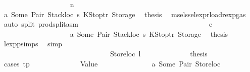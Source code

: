 \begin{isabellebody}
\ \ \ \ \ \ \ \ \ \ \ \ \ \ \ \ \ \ \isamarkupfalse%
\ {\isacharparenleft}{\kern0pt}n\ {\isacharunderscore}{\kern0pt}\ {\isacharunderscore}{\kern0pt}{\isacharparenright}{\kern0pt}\isanewline
\ \ \ \ \ \ \ \ \ \ \ \ \ \ \ \ \ \ \isamarkupfalse%
\ a{}\ Some\ Pair\ Stackloc\ s{}\ KStoptr\ Storage\ \isamarkupfalse%
\ {\isacharquery}{\kern0pt}thesis\ \isamarkupfalse%
\ msel{\isacharunderscore}{\kern0pt}ssel{\isacharunderscore}{\kern0pt}expr{\isacharunderscore}{\kern0pt}load{\isacharunderscore}{\kern0pt}rexp{\isacharunderscore}{\kern0pt}gas{\isacharparenleft}{\kern0pt}{}{\isacharparenright}{\kern0pt}\ \isamarkupfalse%
\ {\isacharparenleft}{\kern0pt}auto\ split{\isacharcolon}{\kern0pt}\ prod{\isachardot}{\kern0pt}split{\isacharunderscore}{\kern0pt}asm{\isacharparenright}{\kern0pt}\isanewline
\ \ \ \ \ \ \ \ \ \ \ \ \ \ \ \ \isamarkupfalse%
\isanewline
\ \ \ \ \ \ \ \ \ \ \ \ \ \ \ \ \ \ \isamarkupfalse%
\ {\isacharparenleft}{\kern0pt}e\ {\isacharunderscore}{\kern0pt}{\isacharparenright}{\kern0pt}\isanewline
\ \ \ \ \ \ \ \ \ \ \ \ \ \ \ \ \ \ \isamarkupfalse%
\ a{}\ Some\ Pair\ Stackloc\ s{}\ KStoptr\ Storage\ \isamarkupfalse%
\ {\isacharquery}{\kern0pt}thesis\ \isamarkupfalse%
\ lexp{\isachardot}{\kern0pt}psimps{\isacharparenleft}{\kern0pt}{}{\isacharparenright}{\kern0pt}\ \isamarkupfalse%
\ simp\isanewline
\ \ \ \ \ \ \ \ \ \ \ \ \ \ \ \ \isamarkupfalse%
\isanewline
\ \ \ \ \ \ \ \ \ \ \ \ \ \ \isamarkupfalse%
\isanewline
\ \ \ \ \ \ \ \ \ \ \ \ \isamarkupfalse%
\isanewline
\ \ \ \ \ \ \ \ \ \ \isamarkupfalse%
\isanewline
\ \ \ \ \ \ \ \ \isamarkupfalse%
\isanewline
\ \ \ \ \ \ \ \ \ \ \isamarkupfalse%
\ {\isacharparenleft}{\kern0pt}Storeloc\ l{\isacharparenright}{\kern0pt}\isanewline
\ \ \ \ \ \ \ \ \ \ \isamarkupfalse%
\ \isamarkupfalse%
\ {\isacharquery}{\kern0pt}thesis\isanewline
\ \ \ \ \ \ \ \ \ \ \isamarkupfalse%
\ {\isacharparenleft}{\kern0pt}cases\ tp{\isacharparenright}{\kern0pt}\isanewline
\ \ \ \ \ \ \ \ \ \ \ \ \isamarkupfalse%
\ {\isacharparenleft}{\kern0pt}Value\ {\isacharunderscore}{\kern0pt}{\isacharparenright}{\kern0pt}\isanewline
\ \ \ \ \ \ \ \ \ \ \ \ \isamarkupfalse%
\ a{}\ Some\ Pair\ Storeloc\ \isamarkupfalse%

\end{isabellebody}
